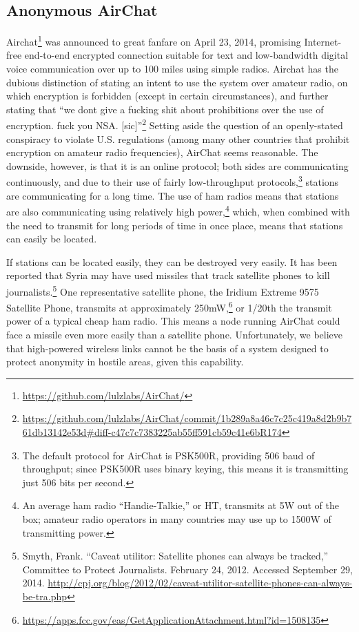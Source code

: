 \documentclass[12pt]{article}
\begin{document}
  \subsection{Anonymous AirChat}
  \label{subsec:airchat}
  
  Airchat\footnote{\url{https://github.com/lulzlabs/AirChat/}} was announced to great fanfare on April 23, 2014, promising Internet-free end-to-end encrypted connection suitable for text and low-bandwidth digital voice communication over up to 100 miles using simple radios. Airchat has the dubious distinction of stating an intent to use the system over amateur radio, on which encryption is forbidden (except in certain circumstances), and further stating that ``we dont give a fucking shit about prohibitions over the use of encryption. fuck you NSA. [sic]''\footnote{\url{https://github.com/lulzlabs/AirChat/commit/1b289a8a46c7c25c419a8d2b9b761db13142e53d\#diff-c47c7c7383225ab55ff591cb59c41e6bR174}} Setting aside the question of an openly-stated conspiracy to violate U.S. regulations (among many other countries that prohibit encryption on amateur radio frequencies), AirChat seems reasonable. The downside, however, is that it is an online protocol; both sides are communicating continuously, and due to their use of fairly low-throughput protocols,\footnote{The default protocol for AirChat is PSK500R, providing 506 baud of throughput; since PSK500R uses binary keying, this means it is transmitting just 506 bits per second.} stations are communicating for a long time. The use of ham radios means that stations are also communicating using relatively high power,\footnote{An average ham radio ``Handie-Talkie,'' or HT, transmits at 5W out of the box; amateur radio operators in many countries may use up to 1500W of transmitting power.} which, when combined with the need to transmit for long periods of time in once place, means that stations can easily be located.
  
  If stations can be located easily, they can be destroyed very easily. It has been reported that Syria may have used missiles that track satellite phones to kill journalists.\footnote{Smyth, Frank. ``Caveat utilitor: Satellite phones can always be tracked,'' Committee to Protect Journalists. February 24, 2012. Accessed September 29, 2014. \url{http://cpj.org/blog/2012/02/caveat-utilitor-satellite-phones-can-always-be-tra.php}} One representative satellite phone, the Iridium Extreme 9575 Satellite Phone, transmits at approximately 250mW,\footnote{\url{https://apps.fcc.gov/eas/GetApplicationAttachment.html?id=1508135}} or 1/20th the transmit power of a typical cheap ham radio. This means a node running AirChat could face a missile even more easily than a satellite phone. Unfortunately, we believe that high-powered wireless links cannot be the basis of a system designed to protect anonymity in hostile areas, given this capability.
  
\end{document}

